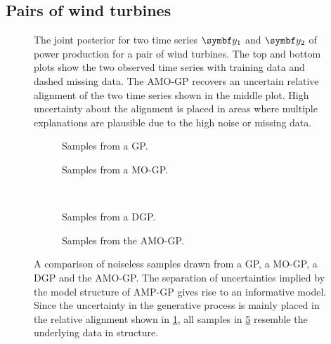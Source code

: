 \subsection{Pairs of wind turbines}
\label{sub:timeseries_alignment:wind_example}
\begin{figure}[tp]
    \centering
    \caption{
        \label{fig:timeseries_alignment:wind_joint_model}
        The joint posterior for two time series $\rv{y_1}$ and $\rv{y_2}$ of power production for a pair of wind turbines.
        The top and bottom plots show the two observed time series with training data and dashed missing data.
        The AMO-GP recovers an uncertain relative alignment of the two time series shown in the middle plot.
        High uncertainty about the alignment is placed in areas where multiple explanations are plausible due to the high noise or missing data.
    }
\end{figure}
\begin{figure}[tp]
    \centering
    \begin{subfigure}[b]{\halffigurewidth}
        \centering
        \caption{
            \label{fig:timeseries_alignment:wind_samples:a}
            Samples from a GP.
        }
    \end{subfigure}
    \hfill
    \begin{subfigure}[b]{\halffigurewidth}
        \centering
        \caption{
            \label{fig:timeseries_alignment:wind_samples:b}
            Samples from a MO-GP.
        }
    \end{subfigure}\\[\figureskip]
    \begin{subfigure}[b]{\halffigurewidth}
        \centering
        \caption{
            \label{fig:timeseries_alignment:wind_samples:c}
            Samples from a DGP.
        }
    \end{subfigure}
    \hfill
    \begin{subfigure}[b]{\halffigurewidth}
        \centering
        \caption{
            \label{fig:timeseries_alignment:wind_samples:d}
            Samples from the AMO-GP.
        }
    \end{subfigure}
    \caption{
        \label{fig:timeseries_alignment:wind_samples}
        A comparison of noiseless samples drawn from a GP, a MO-GP, a DGP and the AMO-GP.
        The separation of uncertainties implied by the model structure of AMP-GP gives rise to an informative model.
        Since the uncertainty in the generative process is mainly placed in the relative alignment shown in \cref{fig:timeseries_alignment:wind_joint_model}, all samples in \cref{fig:timeseries_alignment:wind_samples:d} resemble the underlying data in structure.
    }
\end{figure}

